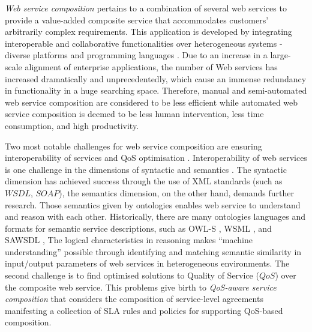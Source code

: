 \documentclass{llncs}
\begin{document}
\textit{Web service composition} pertains to a combination of several web services to provide a value-added composite service that accommodates customers' arbitrarily complex requirements. This application is developed by integrating interoperable and collaborative functionalities over heterogeneous systems - diverse platforms and programming languages \cite{casati2001technologies}. Due to an increase in a large-scale alignment of enterprise applications, the number of Web services has increased dramatically and unprecedentedly, which cause an immense redundancy in functionality in a huge searching space. Therefore, manual and semi-automated web service composition are considered to be less efficient while automated web service composition is deemed to be less human intervention, less time consumption, and high productivity.

Two most notable challenges for web service composition are ensuring interoperability of services and QoS optimisation \cite{fensel2011semantic}. Interoperability of web services is one challenge in the dimensions of syntactic and semantics \cite{fensel2011semantic}. The syntactic dimension has achieved success through the use of XML standards (such as $WSDL$, $SOAP$), the semantics dimension, on the other hand, demands further research. Those semantics given by ontologies \cite{o2005review} enables web service to understand and reason with each other. Historically, there are many ontologies languages and formats for semantic service descriptions, such as OWL-S \cite{martin2004owl}, WSML \cite{fensel2006enabling}, and SAWSDL \cite{lausen2007semantic}, The logical characteristics in reasoning makes ``machine understanding'' possible through identifying and matching semantic similarity in input/output parameters of web services in heterogeneous environments. The second challenge is to find optimised solutions to Quality of Service ($QoS$) over the composite web service. This problems give birth to \textit{QoS-aware service composition} that considers the composition of service-level agreements \cite {sahai2002automated} manifesting a collection of SLA rules and policies for supporting QoS-based composition.
\end{document}
